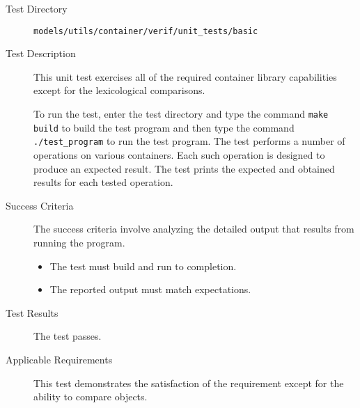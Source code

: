 \label{test:basic}
\begin{description}
\item[Test Directory]
{\tt models/utils/container/verif/unit\_tests/basic}

\item[Test Description]
This unit test exercises all of the required \Cplusplus container library
capabilities except for the lexicological comparisons.

To run the test, enter the test directory and type the command
{\tt make build} to build the test program and then type the command
{\tt ./test\_program} to run the test program.
The test performs a number of operations on various containers.
Each such operation is designed to produce an expected result.
The test prints the expected and obtained results for each tested operation.

\item[Success Criteria]
The success criteria involve analyzing the detailed output that results
from running the program.
\begin{itemize}
\item The test must build and run to completion.
\item The reported output must match expectations.
\end{itemize}

\item[Test Results]
The test passes.

\item[Applicable Requirements]
This test demonstrates the satisfaction of the
requirement  except for
the ability to compare objects.

\end{description}
